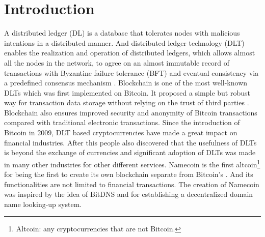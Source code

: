 \section{Introduction}
\label{sec:introduction}

A distributed ledger (DL) is a database that tolerates nodes with malicious intentions in a distributed manner.
And distributed ledger technology (DLT) enables the realization and operation of distributed ledgers,
which allows almost all the nodes in the network, to agree on an almost immutable record of transactions with Byzantine failure tolerance (BFT) and eventual consistency via a predefined consensus mechanism \cite{Sunyaev2020}.
Blockchain is one of the most well-known DLTs which was first implemented on Bitcoin. It proposed a simple but robust way for transaction data storage without relying on the trust of third parties \cite{nakamoto2008peer}.
Blockchain also ensures improved security and anonymity of Bitcoin transactions compared with traditional electronic transactions.
Since the introduction of Bitcoin in 2009, DLT based cryptocurrencies have made a great impact on financial industries. After this people also discovered that the usefulness of DLTs is beyond the exchange of currencies and
significant adoption of DLTs was made in many other industries for other different services.
Namecoin is the first altcoin\footnote{Altcoin: any cryptocurrencies that are not Bitcoin.} for being the first to create its own blockchain separate from Bitcoin's \cite{kalodner2015empirical}.
And its functionalities are not limited to financial transactions.
The creation of Namecoin was inspired by the idea of BitDNS \cite{merited2010bitdns} and for establishing a decentralized domain name looking-up system.



